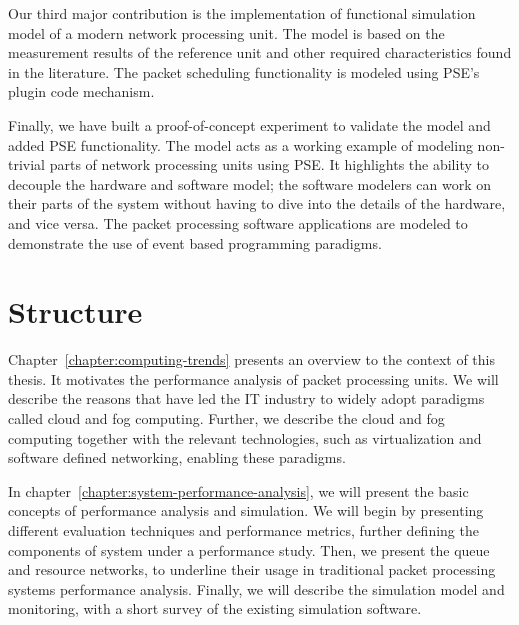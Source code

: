 Our third major contribution is the implementation of functional simulation model of a modern network processing unit. The model is based on the measurement results of the reference unit and other required characteristics found in the literature. The packet scheduling functionality is modeled using PSE's plugin code mechanism.

Finally, we have built a proof-of-concept experiment to validate the model and added PSE functionality. The model acts as a working example of modeling non-trivial parts of network processing units using PSE. It highlights the ability to decouple the hardware and software model; the software modelers can work on their parts of the system without having to dive into the details of the hardware, and vice versa. The packet processing software applications are modeled to demonstrate the use of event based programming paradigms.



\section{Structure}
Chapter~\ref{chapter:computing-trends} presents an overview to the context of this thesis. It motivates the performance analysis of packet processing units. We will describe the reasons that have led the IT industry to widely adopt paradigms called cloud and fog computing. Further, we describe the cloud and fog computing together with the relevant technologies, such as virtualization and software defined networking, enabling these paradigms.


In chapter~\ref{chapter:system-performance-analysis}, we will present the basic concepts of performance analysis and simulation. We will begin by presenting different evaluation techniques and performance metrics, further defining the components of system under a performance study. Then, we present the queue and resource networks, to underline their usage in traditional packet processing systems performance analysis. Finally, we will describe the simulation model and monitoring, with a short survey of the existing simulation software.

